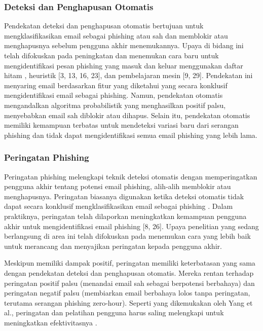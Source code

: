 \documentclass[lettersize,journal]{IEEEtran}
\begin{document}
\subsubsection{Deteksi dan Penghapusan Otomatis}
Pendekatan deteksi dan penghapusan otomatis bertujuan untuk mengklasifikasikan
email sebagai phishing atau sah dan memblokir atau menghapusnya sebelum
pengguna akhir menemukannya. Upaya di bidang ini telah difokuskan pada
peningkatan dan menemukan cara baru untuk mengidentifikasi pesan phishing yang
masuk dan keluar menggunakan daftar hitam \cite{satunol}, heuristik [3, 13, 16,
    23], dan pembelajaran mesin [9, 29]. Pendekatan ini menyaring email berdasarkan
fitur yang diketahui yang secara konklusif mengidentifikasi email sebagai
phishing. Namun, pendekatan otomatis mengandalkan algoritma probabilistik yang
menghasilkan positif palsu, menyebabkan email sah diblokir atau dihapus. Selain
itu, pendekatan otomatis memiliki kemampuan terbatas untuk mendeteksi variasi
baru dari serangan phishing \cite{satudua} dan tidak dapat mengidentifikasi
semua email phishing yang lebih lama.

\subsubsection{Peringatan Phishing}
Peringatan phishing melengkapi teknik deteksi otomatis dengan memperingatkan
pengguna akhir tentang potensi email phishing, alih-alih memblokir atau
menghapusnya. Peringatan biasanya digunakan ketika deteksi otomatis tidak dapat
secara konklusif mengklasifikasikan email sebagai phishing \cite{dualima}.
Dalam praktiknya, peringatan telah dilaporkan meningkatkan kemampuan pengguna
akhir untuk mengidentifikasi email phishing [8, 26]. Upaya penelitian yang
sedang berlangsung di area ini telah difokuskan pada menemukan cara yang lebih
baik untuk merancang dan menyajikan peringatan kepada pengguna akhir.

Meskipun memiliki dampak positif, peringatan memiliki keterbatasan yang sama
dengan pendekatan deteksi dan penghapusan otomatis. Mereka rentan terhadap
peringatan positif palsu (menandai email sah sebagai berpotensi berbahaya) dan
peringatan negatif palsu (membiarkan email berbahaya lolos tanpa peringatan,
terutama serangan phishing zero-hour). Seperti yang dikemukakan oleh Yang et
al., peringatan dan pelatihan pengguna harus saling melengkapi untuk
meningkatkan efektivitasnya \cite{tigatujuh}.
\end{document}
